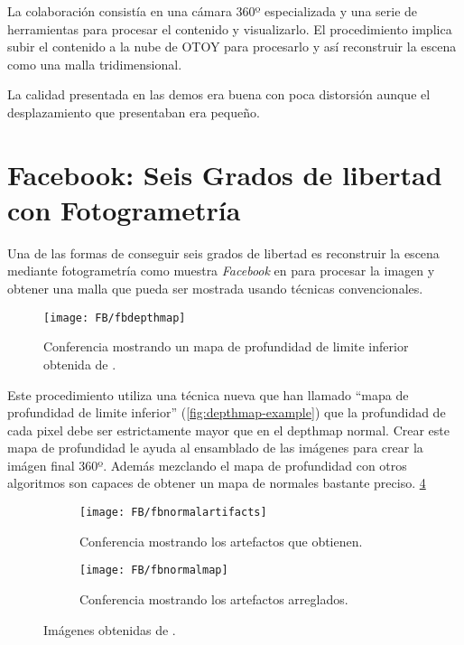 La colaboración consistía en una cámara 360º especializada y una serie de herramientas para procesar el contenido y visualizarlo. El procedimiento implica subir el contenido a la nube de OTOY para procesarlo y así reconstruir la escena como una malla tridimensional.

La calidad presentada en las demos era buena con poca distorsión aunque el desplazamiento que presentaban era pequeño.

\section{Facebook: Seis Grados de libertad con Fotogrametría}
Una de las formas de conseguir seis grados de libertad es reconstruir la escena mediante fotogrametría como muestra \textit{Facebook} en \cite{FBCasual3DCapture} para procesar la imagen y obtener una malla que pueda ser mostrada usando técnicas convencionales.

\begin{figure}[h]
  \centering
	\texttt{[image: FB/fbdepthmap]}
  \caption{Conferencia mostrando un mapa de profundidad de limite inferior obtenida de \cite{FBCasual3DCapture}.}
  \label{fig:fbLBdepthmap-example}
\end{figure}

Este procedimiento utiliza una técnica nueva que han llamado ``mapa de profundidad de limite inferior'' (\ref{fig:depthmap-example}) que la profundidad de cada pixel debe ser estrictamente mayor que en el depthmap normal. Crear este mapa de profundidad le ayuda al ensamblado de las imágenes para crear la imágen final 360º. Además mezclando el mapa de profundidad con otros algoritmos son capaces de obtener un mapa de normales bastante preciso. \ref{fig:fbnormalmapcorrected-example}

\begin{figure}[h]
\centering
\begin{subfigure}{.47\linewidth}
	\centering
	\texttt{[image: FB/fbnormalartifacts]}
  \caption{Conferencia mostrando los artefactos que obtienen.}
  \label{fig:fbnormalmapartifacts-example}
\end{subfigure}%
\hspace{.05\linewidth}
\begin{subfigure}{.47\linewidth}
	\centering
	\texttt{[image: FB/fbnormalmap]}
  \caption{Conferencia mostrando los artefactos arreglados.}
  \label{fig:fbnormalmapcorrected-example}
\end{subfigure}
\caption{Imágenes obtenidas de \cite{FBCasual3DCapture}.}
\end{figure}


